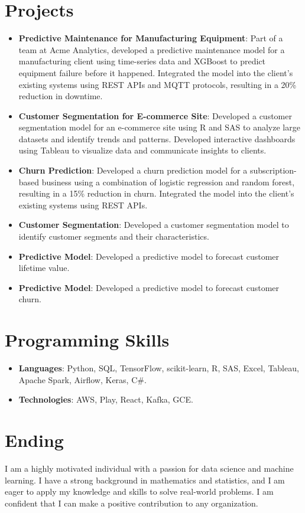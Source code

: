 \documentclass[letterpaper,11pt]{article}
\newcommand{\resumeItem}[2]{
  \item\small{
    \textbf{#1}{: #2 \vspace{-2pt}}
  }
}
\newcommand{\resumeSubItem}[2]{\resumeItem{#1}{#2}\vspace{-4pt}}
\newcommand{\resumeSubHeadingListStart}{\begin{itemize}[leftmargin=*]}
\newcommand{\resumeSubHeadingListEnd}{\end{itemize}}
\begin{document}
\section{Projects}
  \resumeSubHeadingListStart
    \resumeSubItem{Predictive Maintenance for Manufacturing Equipment}
      {Part of a team at Acme Analytics, developed a predictive maintenance model for a manufacturing client using time-series data and XGBoost to predict equipment failure before it happened. Integrated the model into the client's existing systems using REST APIs and MQTT protocols, resulting in a 20\% reduction in downtime.}
    \resumeSubItem{Customer Segmentation for E-commerce Site}
      {Developed a customer segmentation model for an e-commerce site using R and SAS to analyze large datasets and identify trends and patterns. Developed interactive dashboards using Tableau to visualize data and communicate insights to clients.}
    \resumeSubItem{Churn Prediction}
      {Developed a churn prediction model for a subscription-based business using a combination of logistic regression and random forest, resulting in a 15\% reduction in churn. Integrated the model into the client's existing systems using REST APIs.}
    \resumeSubItem{Customer Segmentation}
      {Developed a customer segmentation model to identify customer segments and their characteristics.}
    \resumeSubItem{Predictive Model}
      {Developed a predictive model to forecast customer lifetime value.}
    \resumeSubItem{Predictive Model}
      {Developed a predictive model to forecast customer churn.}
  \resumeSubHeadingListEnd

\section{Programming Skills}
 \resumeSubHeadingListStart
  \resumeSubItem{Languages}
    {Python, SQL, TensorFlow, scikit-learn, R, SAS, Excel, Tableau, Apache Spark, Airflow, Keras, C\#.}
  \resumeSubItem{Technologies}
    {AWS, Play, React, Kafka, GCE.}
 \resumeSubHeadingListEnd

\section{Ending}

I am a highly motivated individual with a passion for data science and machine learning. I have a strong background in mathematics and statistics, and I am eager to apply my knowledge and skills to solve real-world problems. I am confident that I can make a positive contribution to any organization.

 
\end{document}
